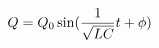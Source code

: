 \documentclass[preview]{standalone}
\begin{document}
\begin{align*}
Q = Q_0 \sin( {1 \over \sqrt{ L C}}t + \phi )
\end{align*}
\end{document}
